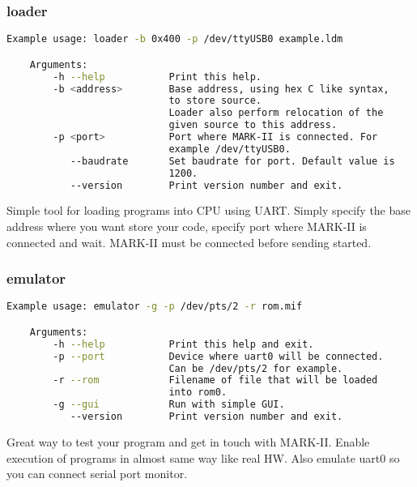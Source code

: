 \subsubsection{loader}

\begin{lstlisting}[language=bash, frame=single]
    Example usage: loader -b 0x400 -p /dev/ttyUSB0 example.ldm

    Arguments:
        -h --help           Print this help.
        -b <address>        Base address, using hex C like syntax,
                            to store source.
                            Loader also perform relocation of the
                            given source to this address.
        -p <port>           Port where MARK-II is connected. For
                            example /dev/ttyUSB0.
           --baudrate       Set baudrate for port. Default value is
                            1200.
           --version        Print version number and exit.
\end{lstlisting}

Simple tool for loading programs into CPU using UART. Simply specify the base
address where you want store your code, specify port where MARK-II is connected
and wait. MARK-II must be connected before sending started.

\subsubsection{emulator}

\begin{lstlisting}[language=bash, frame=single]
    Example usage: emulator -g -p /dev/pts/2 -r rom.mif

    Arguments:
        -h --help           Print this help and exit.
        -p --port           Device where uart0 will be connected.
                            Can be /dev/pts/2 for example.
        -r --rom            Filename of file that will be loaded
                            into rom0.
        -g --gui            Run with simple GUI.
           --version        Print version number and exit.
\end{lstlisting}

Great way to test your program and get in touch with MARK-II. Enable execution
of programs in almost same way like real HW. Also emulate uart0 so you can
connect serial port monitor.
